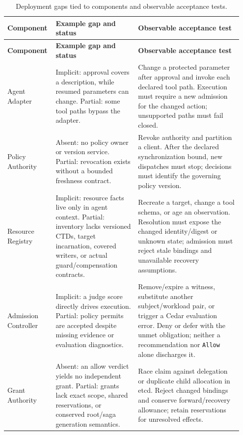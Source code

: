 {\small
\setlength{\LTleft}{0pt}
\setlength{\LTright}{0pt}
\begin{longtable}{@{}L{0.18\linewidth}L{0.34\linewidth}L{0.43\linewidth}@{}}
\caption{Deployment gaps tied to components and observable acceptance tests.}\label{tab:deployment-gaps}\\
\toprule
\textbf{Component} & \textbf{Example gap and status} & \textbf{Observable acceptance test}\\
\midrule
\endfirsthead
\toprule
\textbf{Component} & \textbf{Example gap and status} & \textbf{Observable acceptance test}\\
\midrule
\endhead
\bottomrule
\endfoot
Agent Adapter & Implicit: approval covers a description, while resumed parameters can change. Partial: some tool paths bypass the adapter. & Change a protected parameter after approval and invoke each declared tool path. Execution must require a new admission for the changed action; unsupported paths must fail closed.\\
\addlinespace
Policy Authority & Absent: no policy owner or version service. Partial: revocation exists without a bounded freshness contract. & Revoke authority and partition a client. After the declared synchronization bound, new dispatches must stop; decisions must identify the governing policy version.\\
\addlinespace
Resource Registry & Implicit: resource facts live only in agent context. Partial: inventory lacks versioned CTDs, target incarnation, covered writers, or actual guard/compensation contracts. & Recreate a target, change a tool schema, or age an observation. Resolution must expose the changed identity/digest or unknown state; admission must reject stale bindings and unavailable recovery assumptions.\\
\addlinespace
Admission Controller & Implicit: a judge score directly drives execution. Partial: policy permits are accepted despite missing evidence or evaluation diagnostics. & Remove/expire a witness, substitute another subject/workload pair, or trigger a Cedar evaluation error. Deny or defer with the unmet obligation; neither a recommendation nor \texttt{Allow} alone discharges it.\\
\addlinespace
Grant Authority & Absent: an allow verdict yields no independent grant. Partial: grants lack exact scope, shared reservations, or conserved root/saga generation semantics. & Race claim against delegation or duplicate child allocation in etcd. Reject changed bindings and conserve forward/recovery allowance; retain reservations for unresolved effects.\\

\end{longtable}}
